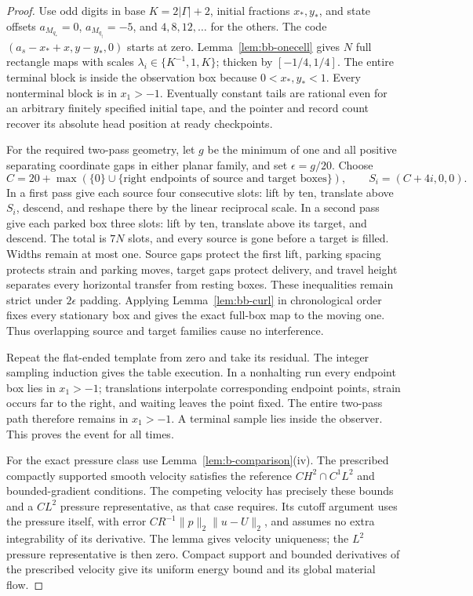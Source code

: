 \begin{proof}
Use odd digits in base $K=2|\Gamma|+2$, initial fractions $x_*,y_*$,
and state offsets $a_{M_{q_*}}=0$, $a_{M_{q_\dagger}}=-5$, and
$4,8,12,\ldots$ for the others.  The code
$(a_s-x_*+x,y-y_*,0)$ starts at zero.  Lemma~\ref{lem:bb-onecell}
gives $N$ full rectangle maps with scales $\lambda_i\in\{K^{-1},1,K\}$;
thicken by $[-1/4,1/4]$.  The entire terminal block is inside the
observation box because $0<x_*,y_*<1$.  Every nonterminal block is
in $x_1>-1$.  Eventually constant tails are rational even for an
arbitrary finitely specified initial tape, and the pointer and record
count recover its absolute head position at ready checkpoints.

For the required two-pass geometry, let $g$ be the minimum of one
and all positive separating coordinate gaps in either planar family,
and set $\epsilon=g/20$.  Choose
\[
 C=20+\max(\{0\}\cup\{\text{right endpoints of source and target boxes}\}),
 \qquad S_i=(C+4i,0,0).
\]
In a first pass give each source four consecutive slots: lift by ten,
translate above $S_i$, descend, and reshape there by the linear
reciprocal scale.  In a second pass give each parked box three slots:
lift by ten, translate above its target, and descend.  The total is
$7N$ slots, and every source is gone before a target is filled.
Widths remain at most one.  Source gaps protect the first lift,
parking spacing protects strain and parking moves, target gaps protect
delivery, and travel height separates every horizontal transfer from
resting boxes.  These inequalities remain strict under $2\epsilon$
padding.  Applying Lemma~\ref{lem:bb-curl} in chronological order
fixes every stationary box and gives the exact full-box map to the
moving one.  Thus overlapping source and target families cause no
interference.

Repeat the flat-ended template from zero and take its residual.
The integer sampling induction gives the table execution.  In a
nonhalting run every endpoint box lies in $x_1>-1$; translations
interpolate corresponding endpoint points, strain occurs far to the
right, and waiting leaves the point fixed.  The entire two-pass path
therefore remains in $x_1>-1$.  A terminal sample lies inside the
observer.  This proves the event for all times.

For the exact pressure class use Lemma~\ref{lem:b-comparison}(iv).
The prescribed compactly supported smooth velocity satisfies the
reference $CH^2\cap C^1L^2$ and bounded-gradient conditions.  The
competing velocity has precisely these bounds and a $CL^2$ pressure
representative, as that case requires.  Its cutoff argument uses the
pressure itself, with error $CR^{-1}\|p\|_2\|u-U\|_2$, and assumes
no extra integrability of its derivative.  The lemma gives velocity
uniqueness; the $L^2$ pressure representative is then zero.
Compact support and
bounded derivatives of the prescribed velocity give its uniform
energy bound and its global material flow.
\end{proof}


